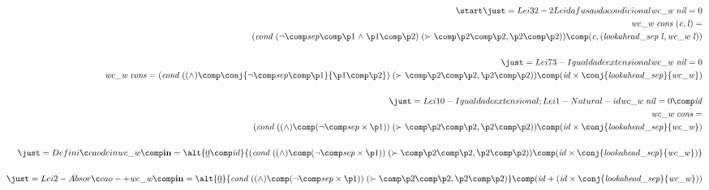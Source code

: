 \documentclass[a4paper]{article}
\newcommand{\Varid}[1]{\mathit{#1}}
\begin{document}
\begin{eqnarray*}
\start
%
\just={Lei 32 - 2 Lei da fusao do condicional}

        \ensuremath{\Varid{wc\char95 w}\;\Varid{nil}\mathrel{=}\mathrm{0}} \\
        \ensuremath{\Varid{wc\char95 w}\;\Varid{cons}\;(\Varid{c},\Varid{l})\mathrel{=}} \\
        \ensuremath{(\Varid{cond}\;(\neg \comp \Varid{sep}\comp \p1\mathrel{\wedge}\p1\comp \p2)\;(\succ \comp \p2\comp \p2,\p2\comp \p2))\comp (\Varid{c},(\Varid{lookahead\char95 sep}\;\Varid{l},\Varid{wc\char95 w}\;\Varid{l}))}
%
\\
\\
\just={Lei 73 - Igualdade extensional}
%
        \ensuremath{\Varid{wc\char95 w}\;\Varid{nil}\mathrel{=}\mathrm{0}} \\
        \ensuremath{\Varid{wc\char95 w}\;\Varid{cons}\mathrel{=}(\Varid{cond}\;((\mathrel{\wedge})\comp \conj{\neg \comp \Varid{sep}\comp \p1}{\p1\comp \p2})\;(\succ \comp \p2\comp \p2,\p2\comp \p2))\comp (\Varid{id}\times\conj{\Varid{lookahead\char95 sep}}{\Varid{wc\char95 w}})}
%
\\
\\
\just={Lei 10 - Igualdade extensional; Lei 1 - Natural-id}
%
        \ensuremath{\Varid{wc\char95 w}\;\Varid{nil}\mathrel{=}\mathrm{0}\comp \Varid{id}} \\
        \ensuremath{\Varid{wc\char95 w}\;\Varid{cons}\mathrel{=}} \\
        \ensuremath{(\Varid{cond}\;((\mathrel{\wedge})\comp (\neg \comp \Varid{sep}\times\p1))\;(\succ \comp \p2\comp \p2,\p2\comp \p2))\comp (\Varid{id}\times\conj{\Varid{lookahead\char95 sep}}{\Varid{wc\char95 w}})}
%
\\
\\
\just={Definiçao de in}
%
        \ensuremath{\Varid{wc\char95 w}\comp \mathbf{in}\mathrel{=}\alt{\underline{\mathrm{0}}\comp \Varid{id}}{(\Varid{cond}\;((\mathrel{\wedge})\comp (\neg \comp \Varid{sep}\times\p1))\;(\succ \comp \p2\comp \p2,\p2\comp \p2))\comp (\Varid{id}\times\conj{\Varid{lookahead\char95 sep}}{\Varid{wc\char95 w}})}}
%
\\
\\
\just={Lei 2 - Absorçao-+}
%
        \ensuremath{\Varid{wc\char95 w}\comp \mathbf{in}\mathrel{=}\alt{\underline{\mathrm{0}}}{\Varid{cond}\;((\mathrel{\wedge})\comp (\neg \comp \Varid{sep}\times\p1))\;(\succ \comp \p2\comp \p2,\p2\comp \p2)}\comp (\Varid{id}\mathbin{+}(\Varid{id}\times\conj{\Varid{lookahead\char95 sep}}{\Varid{wc\char95 w}}))}

\end{eqnarray*}
\end{document}

